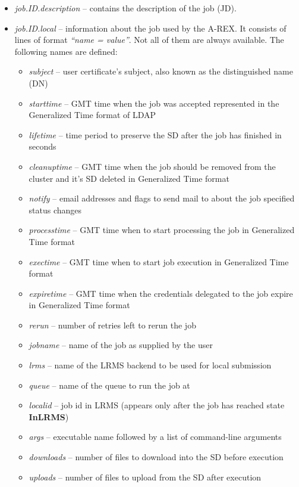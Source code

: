\documentclass{article}                            %
\begin{document}
\begin{itemize}
\item \textit{job.ID.description} -- contains the description of the job
(JD).
\item \textit{job.ID.local} -- information about the job used by the A-REX.
It consists of lines of format \textit{{}``name = value''}. Not
all of them are always available. The following names are defined:

\begin{itemize}
\item \textit{subject} -- user certificate's subject, also known as the distinguished
name (DN)
\item \textit{starttime} -- GMT time when the job was accepted represented
in the Generalized Time format of LDAP 
\item \textit{lifetime} -- time period to preserve the SD after the job has
finished in seconds
\item \textit{cleanuptime} -- GMT time when the job should be removed from
the cluster and it's SD deleted in Generalized Time format
\item \textit{notify} -- email addresses and flags to send mail to about
the job specified status changes
\item \textit{processtime} -- GMT time when to start processing the job in
Generalized Time format
\item \textit{exectime} -- GMT time when to start job execution in Generalized
Time format
\item \textit{expiretime} -- GMT time when the credentials delegated to the
job expire in Generalized Time format
\item \textit{rerun} -- number of retries left to rerun the job
\item \textit{jobname} -- name of the job as supplied by the user
\item \textit{lrms} -- name of the LRMS backend to be used for local submission
\item \textit{queue} -- name of the queue to run the job at
\item \textit{localid} -- job id in LRMS (appears only after the job has
reached state \textbf{InLRMS})
\item \textit{args} -- executable name followed by a list of command-line
arguments
\item \textit{downloads} -- number of files to download into the SD before
execution
\item \textit{uploads} -- number of files to upload from the SD after execution

\end{itemize}
\end{itemize}
\end{document}
